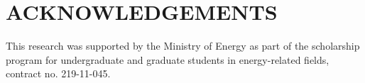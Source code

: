 \documentclass[letterpaper]{mc2021}
\begin{document}

\vspace{-2.5mm}

\section*{ACKNOWLEDGEMENTS}

This research was supported by the Ministry of Energy as part of the scholarship program for undergraduate and graduate students in energy-related fields, contract no. 219-11-045.

\vspace{-2.5mm}

\newif\ifusebibtex
\usebibtextrue

\ifusebibtex
\setlength{\baselineskip}{12pt}


\else
\setlength{\baselineskip}{12pt}
\begin{thebibliography}{300}
\bibitem{journal} B. Author(s), ``Title,'' \emph{Journal Name in Italic}, 
  \textbf{Volume in Bold}, pp. 34-89 (19xx).
\bibitem{proc_paper} C. D. Author(s), ``Article Title,'' \emph{Proceedings of
  Meeting in Italic}, Location, Dates of Meeting, Vol. n, pp. 134-156 
  (19xx).
\bibitem{book} E. F. Author, \emph{Book Title in Italic}, Publisher, City \&
  Country (19xx). 
\bibitem{website} ``Spallation Neutron Source: The next-generation 
  neutron-scattering facility in the United States,'' 
  \url{http://www.sns.gov/documentation/sns\_brochure.pdf} (2002).
\end{thebibliography}
\fi

\end{document}
